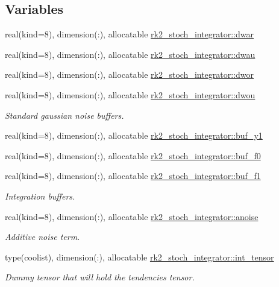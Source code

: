 \subsection*{Variables}
\begin{DoxyCompactItemize}
\item 
real(kind=8), dimension(\+:), allocatable \hyperlink{namespacerk2__stoch__integrator_abfc963ed17f278357be8da9473244c38}{rk2\+\_\+stoch\+\_\+integrator\+::dwar}
\item 
real(kind=8), dimension(\+:), allocatable \hyperlink{namespacerk2__stoch__integrator_a01c22fa8c4f3e14201f3e0f32aa8cc3d}{rk2\+\_\+stoch\+\_\+integrator\+::dwau}
\item 
real(kind=8), dimension(\+:), allocatable \hyperlink{namespacerk2__stoch__integrator_afd5ed4abd1a2c69b89beb41d2718e702}{rk2\+\_\+stoch\+\_\+integrator\+::dwor}
\item 
real(kind=8), dimension(\+:), allocatable \hyperlink{namespacerk2__stoch__integrator_a8c5c398d4bf895571169d6fd78300df0}{rk2\+\_\+stoch\+\_\+integrator\+::dwou}
\begin{DoxyCompactList}\small\item\em Standard gaussian noise buffers. \end{DoxyCompactList}\item 
real(kind=8), dimension(\+:), allocatable \hyperlink{namespacerk2__stoch__integrator_a549cd39d4971e7b9268a4beb079feb80}{rk2\+\_\+stoch\+\_\+integrator\+::buf\+\_\+y1}
\item 
real(kind=8), dimension(\+:), allocatable \hyperlink{namespacerk2__stoch__integrator_a3dbdf4830785d5db95d610433de2d0bd}{rk2\+\_\+stoch\+\_\+integrator\+::buf\+\_\+f0}
\item 
real(kind=8), dimension(\+:), allocatable \hyperlink{namespacerk2__stoch__integrator_aea615b16fd861e4ccb1f26c4ee64df85}{rk2\+\_\+stoch\+\_\+integrator\+::buf\+\_\+f1}
\begin{DoxyCompactList}\small\item\em Integration buffers. \end{DoxyCompactList}\item 
real(kind=8), dimension(\+:), allocatable \hyperlink{namespacerk2__stoch__integrator_a7d810360a0ea3b9cc7878fd6cfe8e39d}{rk2\+\_\+stoch\+\_\+integrator\+::anoise}
\begin{DoxyCompactList}\small\item\em Additive noise term. \end{DoxyCompactList}\item 
type(coolist), dimension(\+:), allocatable \hyperlink{namespacerk2__stoch__integrator_a0bf74d9bd925f796fa25569ab96997fb}{rk2\+\_\+stoch\+\_\+integrator\+::int\+\_\+tensor}
\begin{DoxyCompactList}\small\item\em Dummy tensor that will hold the tendencies tensor. \end{DoxyCompactList}\end{DoxyCompactItemize}

